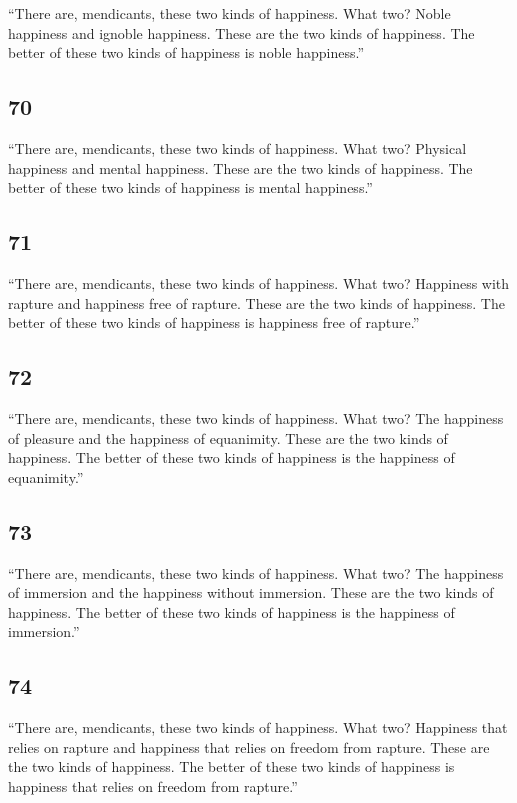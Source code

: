 \documentclass[12pt,openany]{book}%
\begin{document}
“There are, mendicants, these two kinds of happiness. What two? Noble happiness and ignoble happiness. These are the two kinds of happiness. The better of these two kinds of happiness is noble happiness.” 

\subsection*{70 }

“There are, mendicants, these two kinds of happiness. What two? Physical happiness and mental happiness. These are the two kinds of happiness. The better of these two kinds of happiness is mental happiness.” 

\subsection*{71 }

“There are, mendicants, these two kinds of happiness. What two? Happiness with rapture and happiness free of rapture. These are the two kinds of happiness. The better of these two kinds of happiness is happiness free of rapture.” 

\subsection*{72 }

“There are, mendicants, these two kinds of happiness. What two? The happiness of pleasure and the happiness of equanimity. These are the two kinds of happiness. The better of these two kinds of happiness is the happiness of equanimity.” 

\subsection*{73 }

“There are, mendicants, these two kinds of happiness. What two? The happiness of immersion and the happiness without immersion. These are the two kinds of happiness. The better of these two kinds of happiness is the happiness of immersion.” 

\subsection*{74 }

“There are, mendicants, these two kinds of happiness. What two? Happiness that relies on rapture and happiness that relies on freedom from rapture. These are the two kinds of happiness. The better of these two kinds of happiness is happiness that relies on freedom from rapture.” 
\end{document}
